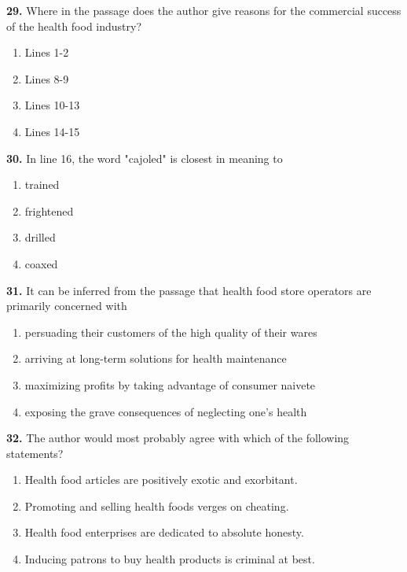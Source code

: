\documentclass[12pt]{article}
\begin{document}
\par
\vspace{0.25\baselineskip}
\noindent\textbf{29.} Where in the passage does the author give reasons for the commercial success of the health food industry?
\begin{enumerate}[label=(\Alph*),leftmargin=*,itemsep=0.2em]
\item Lines 1-2
\item Lines 8-9
\item Lines 10-13
\item Lines 14-15
\end{enumerate}
\par
\vspace{0.25\baselineskip}
\noindent\textbf{30.} In line 16, the word "cajoled" is closest in meaning to
\begin{enumerate}[label=(\Alph*),leftmargin=*,itemsep=0.2em]
\item trained
\item frightened
\item drilled
\item coaxed
\end{enumerate}
\par
\vspace{0.25\baselineskip}
\noindent\textbf{31.} It can be inferred from the passage that health food store operators are primarily concerned with
\begin{enumerate}[label=(\Alph*),leftmargin=*,itemsep=0.2em]
\item persuading their customers of the high quality of their wares
\item arriving at long-term solutions for health maintenance
\item maximizing profits by taking advantage of consumer naivete
\item exposing the grave consequences of neglecting one's health
\end{enumerate}
\par
\vspace{0.25\baselineskip}
\noindent\textbf{32.} The author would most probably agree with which of the following statements?
\begin{enumerate}[label=(\Alph*),leftmargin=*,itemsep=0.2em]
\item Health food articles are positively exotic and exorbitant.
\item Promoting and selling health foods verges on cheating.
\item Health food enterprises are dedicated to absolute honesty.
\item Inducing patrons to buy health products is criminal at best.
\end{enumerate}
\par
\vspace{0.25\baselineskip}
\end{document}
